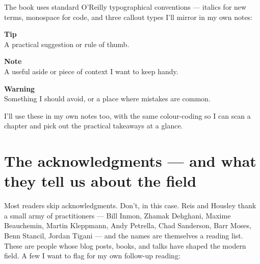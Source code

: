 The book uses standard O'Reilly typographical conventions — italics for new terms, monospace for code, and three callout types I'll mirror in my own notes:

\begin{tipbox}
\textbf{\color{berkeleyblue}Tip}\\
A practical suggestion or rule of thumb.
\end{tipbox}

\begin{notebox}
\textbf{\color{berkeleyblue}Note}\\
A useful aside or piece of context I want to keep handy.
\end{notebox}

\begin{warnbox}
\textbf{\color{berkeleyblue}Warning}\\
Something I should avoid, or a place where mistakes are common.
\end{warnbox}

I'll use these in my own notes too, with the same colour-coding so I can scan a chapter and pick out the practical takeaways at a glance.

\section*{The acknowledgments — and what they tell us about the field}

Most readers skip acknowledgments. Don't, in this case. Reis and Housley thank a small army of practitioners — Bill Inmon, Zhamak Dehghani, Maxime Beauchemin, Martin Kleppmann, Andy Petrella, Chad Sanderson, Barr Moses, Benn Stancil, Jordan Tigani — and the names are themselves a reading list. These are people whose blog posts, books, and talks have shaped the modern field. A few I want to flag for my own follow-up reading:

